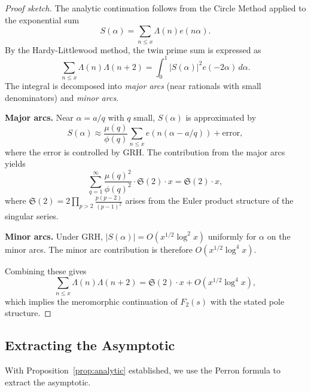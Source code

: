 \documentclass[11pt,a4paper]{article}
\theoremstyle{remark}
\newcommand{\tw}{\mathfrak{S}}
\begin{document}
\begin{proof}[Proof sketch]
The analytic continuation follows from the Circle Method applied to the exponential sum
\[
S(\alpha) = \sum_{n \le x} \Lambda(n) e(n\alpha).
\]
By the Hardy-Littlewood method, the twin prime sum is expressed as
\[
\sum_{n \le x} \Lambda(n)\Lambda(n+2) = \int_0^1 |S(\alpha)|^2 e(-2\alpha) \, d\alpha.
\]
The integral is decomposed into \emph{major arcs} (near rationals with small denominators) and \emph{minor arcs}.

\textbf{Major arcs.} Near $\alpha = a/q$ with $q$ small, $S(\alpha)$ is approximated by
\[
S(\alpha) \approx \frac{\mu(q)}{\phi(q)} \sum_{n \le x} e(n(\alpha - a/q)) + \text{error},
\]
where the error is controlled by GRH. The contribution from the major arcs yields
\[
\sum_{q=1}^{\infty} \frac{\mu(q)^2}{\phi(q)^2} \cdot \tw(2) \cdot x = \tw(2) \cdot x,
\]
where $\tw(2) = 2\prod_{p>2} \frac{p(p-2)}{(p-1)^2}$ arises from the Euler product structure of the singular series.

\textbf{Minor arcs.} Under GRH, $|S(\alpha)| = O(x^{1/2} \log^2 x)$ uniformly for $\alpha$ on the minor arcs. The minor arc contribution is therefore $O(x^{1/2} \log^4 x)$.

Combining these gives
\[
\sum_{n \le x} \Lambda(n)\Lambda(n+2) = \tw(2) \cdot x + O(x^{1/2} \log^4 x),
\]
which implies the meromorphic continuation of $F_2(s)$ with the stated pole structure.
\end{proof}

\subsection{Extracting the Asymptotic}

With Proposition~\ref{prop:analytic} established, we use the Perron formula to extract the asymptotic.
\end{document}
